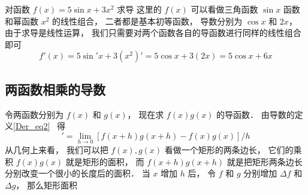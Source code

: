 \begin{example}{对函数 $f(x) = 5\sin x + 3x^2$ 求导}
这里的 $f(x)$ 可以看做三角函数 $\sin x$ 函数和幂函数 $x^2$ 的线性组合， 二者都是基本初等函数， 导数分别为 $\cos x$ 和 $2x$， 由于求导是线性运算， 我们只需要对两个函数各自的导函数进行同样的线性组合即可
\begin{equation}
f'(x) = 5 \sin' x + 3(x^2)' = 5 \cos x + 3(2x) = 5\cos x + 6x
\end{equation}
\end{example}

\subsection{两函数相乘的导数}
令两函数分别为 $f(x)$ 和 $g(x)$， 现在求 $f(x) g(x)$ 的导函数． 由导数的定义\autoref{Der_eq2}~ 得
\begin{equation}
[f(x)g(x)]' = \lim_{h\to 0} [f(x+h)g(x+h) - f(x)g(x)]/h
\end{equation}
从几何上来看， 我们可以把 $f(x), g(x)$ 看做一个矩形的两条边长， 它们的乘积 $f(x)g(x)$ 就是矩形的面积， 而 $f(x+h)g(x+h)$ 就是把矩形两条边长分别改变一个很小的长度后的面积． 当 $x$ 增加 $h$ 后， 令 $f$ 和 $g$ 分别增加 $\Delta f$ 和 $\Delta g$， 那么矩形面积
